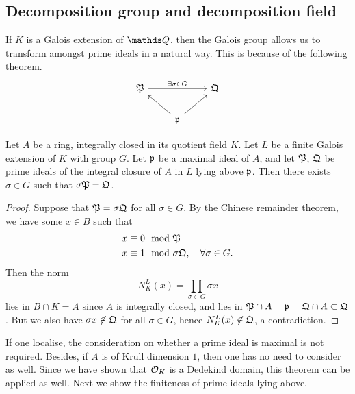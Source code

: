 		\subsection{Decomposition group and decomposition field}
			If $K$ is a Galois extension of $\Q$, then the Galois group allows us to transform amongst prime ideals in a natural way. This is because of the following theorem.
			\[
				\begin{tikzcd}
					\mathfrak{P} \arrow[rr, "\exists \sigma \in G"] &                                    & \mathfrak{Q} \\
					& \mathfrak{p} \arrow[lu] \arrow[ru] &             
				\end{tikzcd}
			\]
			\begin{theorem}\label{galois-lie-above}
				Let $A$ be a ring, integrally closed in its quotient field $K$. Let $L$ be a finite Galois extension of $K$ with group $G$. Let $\mathfrak{p}$ be a maximal ideal of $A$, and let $\mathfrak{P}$, $\mathfrak{Q}$ be prime ideals of the integral closure of $A$ in $L$ lying above $\mathfrak{p}$. Then there exists $\sigma \in G$ such that $\sigma\mathfrak{P} = \mathfrak{Q}$.
			\end{theorem}
			\begin{proof}
				Suppose that $\mathfrak{P}=\sigma\mathfrak{Q}$ for all $\sigma \in G$. By the Chinese remainder theorem, we have some $x \in B$ such that 
				\[
					\begin{aligned}
						x &\equiv 0 \mod {\mathfrak}{P} \\
						x &\equiv 1 \mod \sigma\mathfrak{Q}, \quad \forall \sigma \in G.
					\end{aligned}
				\]
				Then the norm
				\[
					N_K^L(x) = \prod_{\sigma \in G}\sigma{x}
				\]
				lies in $B \cap K = A$ since $A$ is integrally closed, and lies in $\mathfrak{P} \cap A = \mathfrak{p}=\mathfrak{Q} \cap A \subset \mathfrak{Q}$. But we also have $\sigma{x} \not\in \mathfrak{Q}$ for all $\sigma \in G$, hence $N_K^L(x) \not \in \mathfrak{Q}$, a contradiction.
			\end{proof}
			If one localise, the consideration on whether a prime ideal is maximal is not required. Besides, if $A$ is of Krull dimension $1$, then one has no need to consider as well. Since we have shown that $\mathcal{O}_K$ is a Dedekind domain, this theorem can be applied as well. Next we show the finiteness of prime ideals lying above.
			
